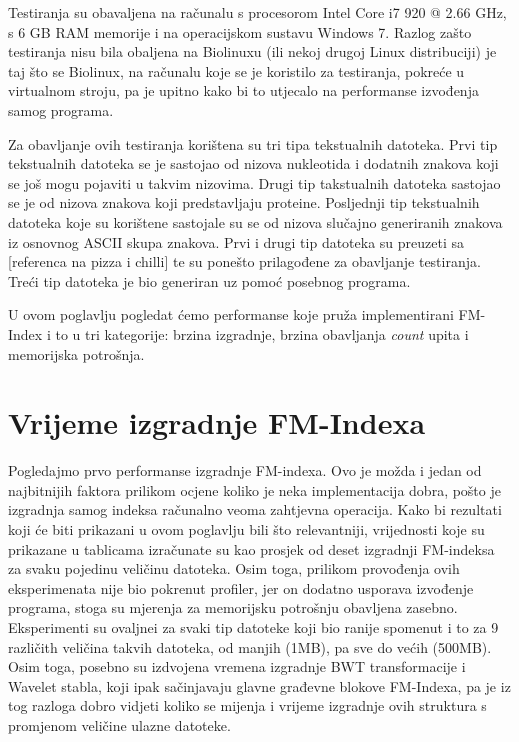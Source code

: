 Testiranja su obavaljena na računalu s procesorom Intel Core i7 920 @ 2.66 GHz, s 6 GB RAM memorije i na operacijskom sustavu Windows 7. Razlog zašto testiranja nisu bila obaljena na Biolinuxu (ili nekoj drugoj Linux distribuciji) je taj što se Biolinux, na računalu koje se je koristilo za testiranja, pokreće u virtualnom stroju, pa je upitno kako bi to utjecalo na performanse izvođenja samog programa.

Za obavljanje ovih testiranja korištena su tri tipa tekstualnih datoteka. Prvi tip tekstualnih datoteka se je sastojao od nizova nukleotida i dodatnih znakova koji se još mogu pojaviti u takvim nizovima. Drugi tip takstualnih datoteka sastojao se je od nizova znakova koji predstavljaju proteine. Posljednji tip tekstualnih datoteka koje su korištene sastojale su se od nizova slučajno generiranih znakova iz osnovnog ASCII skupa znakova. Prvi i drugi tip datoteka su preuzeti sa [referenca na pizza i chilli] te su ponešto prilagođene za obavljanje testiranja. Treći tip datoteka je bio generiran uz pomoć posebnog programa.

U ovom poglavlju pogledat ćemo performanse koje pruža implementirani FM-Index i to u tri kategorije: brzina izgradnje, brzina obavljanja \textit{count} upita i memorijska potrošnja.

\section{Vrijeme izgradnje FM-Indexa}
Pogledajmo prvo performanse izgradnje FM-indexa. Ovo je možda i jedan od najbitnijih faktora prilikom ocjene koliko je neka implementacija dobra, pošto je izgradnja samog indeksa računalno veoma zahtjevna operacija. Kako bi rezultati koji će biti prikazani u ovom poglavlju bili što relevantniji, vrijednosti koje su prikazane u tablicama izračunate su kao prosjek od deset izgradnji FM-indeksa za svaku pojedinu veličinu datoteka. Osim toga, prilikom provođenja ovih eksperimenata nije bio pokrenut profiler, jer on dodatno usporava izvođenje programa, stoga su mjerenja za memorijsku potrošnju obavljena zasebno. Eksperimenti su ovaljnei za svaki tip datoteke koji bio ranije spomenut i to za 9 različith veličina takvih datoteka, od manjih (1MB), pa sve do većih (500MB). Osim toga, posebno su izdvojena vremena izgradnje BWT transformacije i Wavelet stabla, koji ipak sačinjavaju glavne građevne blokove FM-Indexa, pa je iz tog razloga dobro vidjeti koliko se mijenja i vrijeme izgradnje ovih struktura s promjenom veličine ulazne datoteke.

